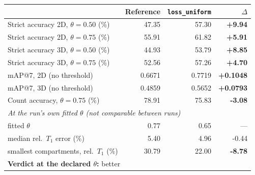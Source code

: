 \renewcommand{\arraystretch}{1.05}
\begin{tabular}{lrrr}
\toprule
 & Reference & \texttt{loss\_uniform} & $\Delta$ \\
\midrule
Strict accuracy 2D, $\theta = 0.50$ (\%) & 47.35 & 57.30 & \textbf{+9.94} \\
Strict accuracy 2D, $\theta = 0.75$ (\%) & 55.91 & 61.82 & \textbf{+5.91} \\
Strict accuracy 3D, $\theta = 0.50$ (\%) & 44.93 & 53.79 & \textbf{+8.85} \\
Strict accuracy 3D, $\theta = 0.75$ (\%) & 52.56 & 57.26 & \textbf{+4.70} \\
\midrule
mAP@7, 2D (no threshold) & 0.6671 & 0.7719 & \textbf{+0.1048} \\
mAP@7, 3D (no threshold) & 0.4859 & 0.5652 & \textbf{+0.0793} \\
\midrule
Count accuracy, $\theta = 0.75$ (\%) & 78.91 & 75.83 & \textbf{-3.08} \\
\midrule
\multicolumn{4}{l}{\emph{At the run's own fitted $\theta$ (not comparable between runs)}} \\
\quad fitted $\theta$ & 0.77 & 0.65 & --- \\
\quad median rel.\ $T_1$ error (\%) & 5.40 & 4.96 & -0.44 \\
\quad smallest compartments, rel.\ $T_1$ (\%) & 30.79 & 22.00 & \textbf{-8.78} \\
\midrule
\multicolumn{4}{l}{\textbf{Verdict at the declared $\theta$:} better} \\
\bottomrule
\end{tabular}
